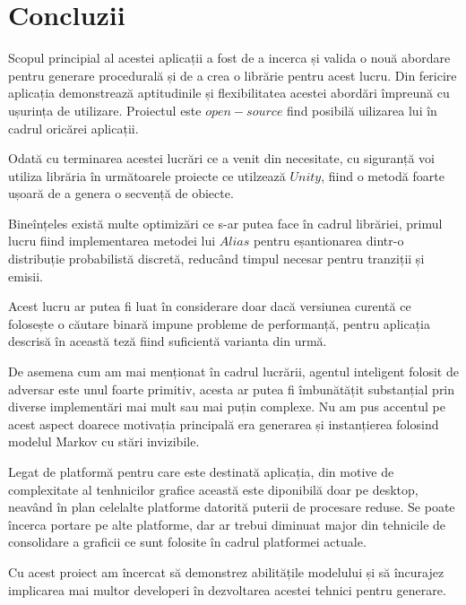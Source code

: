 \chapter*{Concluzii} 

Scopul principial al acestei aplicații a fost de a incerca și valida o nouă abordare pentru generare procedurală și de a crea o librărie pentru acest lucru. Din fericire aplicația demonstrează aptitudinile și flexibilitatea acestei abordări împreună cu ușurința de utilizare. Proiectul este $open-source$ find posibilă uilizarea lui în cadrul oricărei aplicații.\par

Odată cu terminarea acestei lucrări ce a venit din necesitate, cu siguranță voi utiliza librăria în următoarele proiecte ce utilzează $Unity$, fiind o metodă foarte ușoară de a genera o secvență de obiecte.\par

Bineînțeles există multe optimizări ce s-ar putea face în cadrul librăriei, primul lucru fiind implementarea metodei lui $Alias$ pentru eșantionarea dintr-o distribuție probabilistă discretă, reducând timpul necesar pentru tranziții și emisii.\par 

Acest lucru ar putea fi luat în considerare doar dacă versiunea curentă ce folosește o căutare binară impune probleme de performanță, pentru aplicația descrisă în această teză fiind suficientă varianta din urmă.\par

De asemena cum am mai menționat în cadrul lucrării, agentul inteligent folosit de adversar este unul foarte primitiv, acesta ar putea fi îmbunătățit substanțial prin diverse implementări mai mult sau mai puțin complexe. Nu am pus accentul pe acest aspect doarece motivația principală era generarea și instanțierea folosind modelul Markov cu stări invizibile.\par

Legat de platformă pentru care este destinată aplicația, din motive de complexitate al tenhnicilor grafice această este diponibilă doar pe desktop, neavând în plan celelalte platforme datorită puterii de procesare reduse. Se poate încerca portare pe alte platforme, dar ar trebui diminuat major din tehnicile de consolidare a graficii ce sunt folosite în cadrul platformei actuale.\par

Cu acest proiect am încercat să demonstrez abilitățile modelului și să încurajez implicarea mai multor developeri în dezvoltarea acestei tehnici pentru generare.\par
